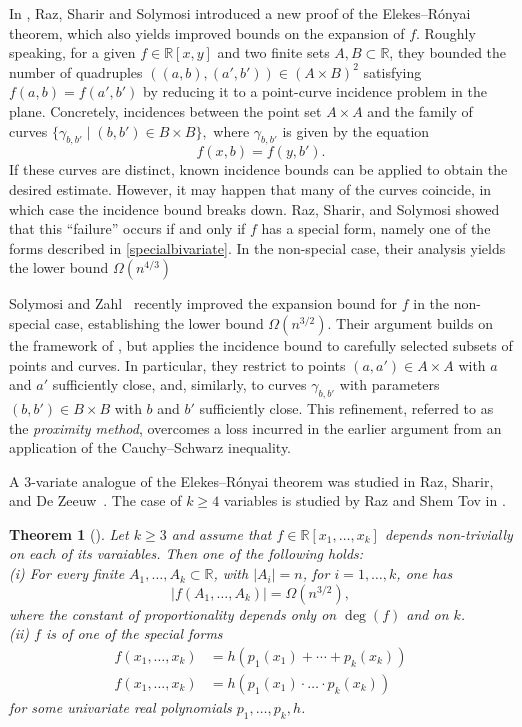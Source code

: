 \documentclass[letterpaper, reqno,11pt]{article}
\newcommand{\RR}{\mathbb{R}}
\newtheorem{thm}{Theorem}%
\theoremstyle{definition}
\theoremstyle{remark}
\begin{document}
In \cite{RazShaSol}, Raz, Sharir and Solymosi introduced a new proof of the Elekes--R\'onyai theorem, which also yields improved bounds on the expansion of $f$. 
Roughly speaking, for a given $f\in \RR[x,y]$ and two finite sets $A,B\subset \RR$, they bounded the number of quadruples $((a,b),(a',b'))\in (A\times B)^2$ satisfying $f(a,b)=f(a',b')$ by reducing it to a  point-curve incidence problem in the plane. Concretely, incidences between the point set $A\times A$ and the family of curves 
$\{\gamma_{b,b'}\mid (b,b')\in B\times B\},$
where $\gamma_{b,b'}$ is given by the equation 
$$f(x,b)=f(y,b').$$ 
If these curves are distinct, known incidence bounds can be applied to obtain the desired estimate. However, it may happen that many of the curves coincide, in which case the incidence bound breaks down. Raz, Sharir, and Solymosi showed that this ``failure” occurs if and only if 
$f$ has a special form, namely one of the forms described in \eqref{specialbivariate}. 
In the non-special case, their analysis yields the lower bound $\Omega(n^{4/3})$


Solymosi and Zahl~\cite{SolZah} recently improved the expansion bound for $f$ in the non-special case, establishing the lower bound $\Omega(n^{3/2})$. Their argument builds on the framework of \cite{RazShaSol}, but applies the incidence bound to carefully selected subsets of points and curves. In particular, they restrict to points $(a,a')\in A\times A$ with $a$ and $a'$ sufficiently close, and, similarly, to curves $\gamma_{b,b'}$ with parameters $(b,b')\in B\times B$  with $b$ and $b'$ sufficiently close. This refinement, referred to as the {\it proximity method}, 
overcomes a loss incurred in the earlier argument from an application of the Cauchy--Schwarz inequality.


A $3$-variate analogue of the Elekes--R\'onyai theorem was studied in Raz, Sharir, and De Zeeuw~\cite{RazShaDeZee4D}. The case of 
  $k\ge 4$ variables is studied by Raz and Shem Tov in \cite{RazShe}.
\begin{thm}[{\bf \cite{RazShaDeZee4D, RazShe}}]\label{dvarER}
Let $k\ge 3$ and assume that  $f\in \RR[x_1,\ldots,x_k]$ depends non-trivially on each of its varaiables. Then one of the following holds:\\
(i) For every finite $A_1,\ldots,A_k\subset \RR$, with $|A_i|=n$, for $i=1,\ldots,k$, one has
$$
|f(A_1,\ldots,A_k)|=\Omega(n^{3/2}),
$$
where the constant of proportionality depends only on $\deg(f)$ and on $k$. \\
(ii) $f$ is of one of the special forms
\begin{align}
f(x_1,\ldots,x_k)&=h(p_1(x_1)+\cdots +p_k(x_k))\label{kvarspecial}\\
f(x_1,\ldots,x_k)&=h(p_1(x_1)\cdot\ldots\cdot p_k(x_k)) \nonumber
\end{align}
for some univariate real polynomials $p_1,\ldots,p_k,h$.
\end{thm} 
\end{document}
